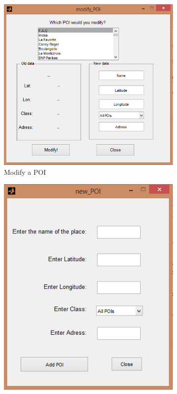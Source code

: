 \documentclass{article}
\begin{document}
\begin{figure}[h]
        \centering
        \begin{subfigure}[b]{0.3\textwidth}
                \includegraphics[width=\textwidth]{modify_poi}
                \caption{Modify a POI}
                \label{fig:modify_poi}
        \end{subfigure}%
        \qquad %
        \begin{subfigure}[b]{0.3\textwidth}
                \includegraphics[width=\textwidth]{new_poi}

\end{subfigure}
\end{figure}
\end{document}
